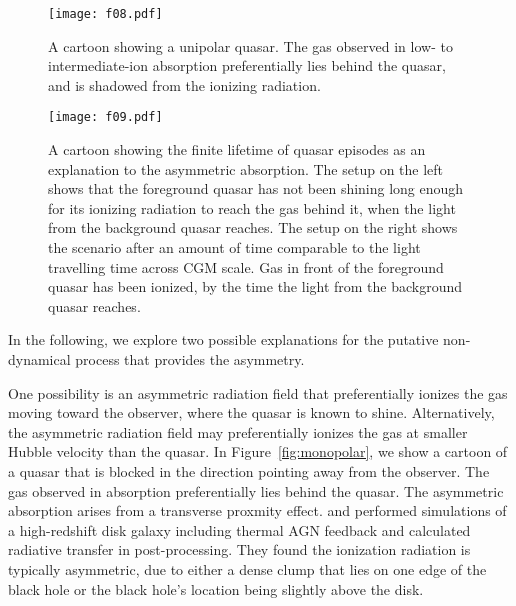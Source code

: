 \documentclass[iop]{emulateapj}
\begin{document}
\begin{figure*}[!th]
\begin{minipage}[!bp]{0.28\textwidth}
\texttt{[image: f08.pdf]}
\caption{A cartoon showing a unipolar quasar. The gas observed in low- to intermediate-ion 
absorption preferentially lies behind the quasar, and is shadowed from the ionizing radiation. 
}
\label{fig:monopolar}
\end{minipage}%
\hspace{0.3in}
\begin{minipage}[!bp]{0.67\textwidth}
\texttt{[image: f09.pdf]}
\caption{A cartoon showing the finite lifetime of quasar episodes as an explanation to the 
asymmetric absorption. The setup on the left shows that the foreground quasar has not been shining 
long enough for its ionizing radiation to reach the gas behind it, when the light from the 
background quasar reaches. The setup on the right shows the scenario after an amount of time 
comparable to the light travelling time across CGM scale. Gas in front of the foreground quasar 
has been ionized, by the time the light from the background quasar reaches. 
}
\label{fig:lighttravel}
\end{minipage}
\end{figure*}

In the following, we explore two possible explanations for the putative non-dynamical process that 
provides the asymmetry. 

One possibility is an asymmetric radiation field that preferentially ionizes the gas moving toward 
the observer, where the quasar is known to shine. Alternatively, the asymmetric radiation field 
may preferentially ionizes the gas at smaller Hubble velocity than the quasar. In 
Figure~\ref{fig:monopolar}, we show a cartoon of a quasar that is blocked in the direction 
pointing away from the observer. The gas observed in absorption preferentially lies behind the 
quasar. The asymmetric absorption arises from a transverse proxmity effect. 
\cite{Roos+15} and \cite{GaborBournaud14} performed simulations of a high-redshift disk galaxy 
including thermal AGN feedback and calculated radiative transfer in post-processing. They found 
the ionization radiation is typically asymmetric, due to either a dense clump that lies on one 
edge of the black hole or the black hole's location being slightly above the disk. 
\end{document}
